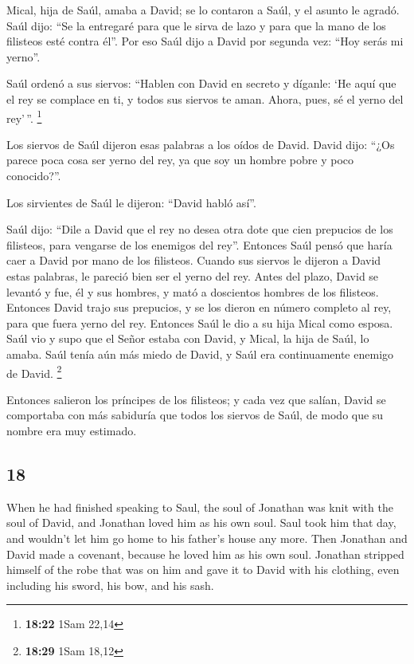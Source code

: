 \begin{paracol}{2}
 Mical, hija de Saúl, amaba a David; se lo contaron a
Saúl, y el asunto le agradó.  Saúl dijo: ``Se la
entregaré para que le sirva de lazo y para que la mano de los filisteos
esté contra él''. Por eso Saúl dijo a David por segunda vez: ``Hoy serás
mi yerno''.

 Saúl ordenó a sus siervos: ``Hablen con David en secreto
y díganle: `He aquí que el rey se complace en ti, y todos sus siervos te
aman. Ahora, pues, sé el yerno del rey'\,''. \footnote{\textbf{18:22}
  1Sam 22,14}

 Los siervos de Saúl dijeron esas palabras a los oídos de
David. David dijo: ``¿Os parece poca cosa ser yerno del rey, ya que soy
un hombre pobre y poco conocido?''.

 Los sirvientes de Saúl le dijeron: ``David habló así''.

 Saúl dijo: ``Dile a David que el rey no desea otra dote
que cien prepucios de los filisteos, para vengarse de los enemigos del
rey''. Entonces Saúl pensó que haría caer a David por mano de los
filisteos.  Cuando sus siervos le dijeron a David estas
palabras, le pareció bien ser el yerno del rey. Antes del plazo,
 David se levantó y fue, él y sus hombres, y mató a
doscientos hombres de los filisteos. Entonces David trajo sus prepucios,
y se los dieron en número completo al rey, para que fuera yerno del rey.
Entonces Saúl le dio a su hija Mical como esposa.  Saúl
vio y supo que el Señor estaba con David, y Mical, la hija de Saúl, lo
amaba.  Saúl tenía aún más miedo de David, y Saúl era
continuamente enemigo de David. \footnote{\textbf{18:29} 1Sam 18,12}

 Entonces salieron los príncipes de los filisteos; y cada
vez que salían, David se comportaba con más sabiduría que todos los
siervos de Saúl, de modo que su nombre era muy estimado.

\switchcolumn
\begin{otherlanguage}{english}

\hypertarget{section-35}{%
\section{18}\label{section-35}}

 When he had finished speaking to Saul, the soul of
Jonathan was knit with the soul of David, and Jonathan loved him as his
own soul.  Saul took him that day, and wouldn't let him go
home to his father's house any more.  Then Jonathan and
David made a covenant, because he loved him as his own soul.
 Jonathan stripped himself of the robe that was on him and
gave it to David with his clothing, even including his sword, his bow,
and his sash.


\end{otherlanguage}
\end{paracol}
